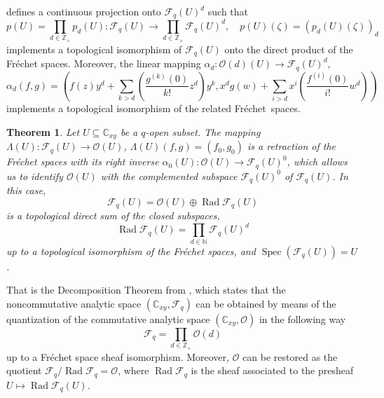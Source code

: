 \documentclass[12pt,reqno]{amsart}%
\newtheorem{theorem}{Theorem}
\theoremstyle{plain}
\numberwithin{theorem}{section} \numberwithin{equation}{section}
\numberwithin{lemma}{section}
\numberwithin{remark}{section}
\numberwithin{example}{section}
\numberwithin{proposition}{section}
\numberwithin{definition}{section}
\numberwithin{corollary}{section}
\begin{document}
defines a continuous projection onto $\mathcal{F}_{q}\left(  U\right)  ^{d}$
such that
\[
p\left(  U\right)  =\prod_{d\in\mathbb{Z}_{+}}p_{d}\left(  U\right)
:\mathcal{F}_{q}\left(  U\right)  \rightarrow\prod_{d\in\mathbb{Z}_{+}%
}\mathcal{F}_{q}\left(  U\right)  ^{d},\quad p\left(  U\right)  \left(
\zeta\right)  =\left(  p_{d}\left(  U\right)  \left(  \zeta\right)  \right)
_{d}%
\]
implements a topological isomorphism of $\mathcal{F}_{q}\left(  U\right)  $
onto the direct product of the Fr\'{e}chet spaces. Moreover, the linear
mapping $\alpha_{d}:\mathcal{O}\left(  d\right)  \left(  U\right)
\rightarrow\mathcal{F}_{q}\left(  U\right)  ^{d},$
\[
\alpha_{d}\left(  f,g\right)  =\left(  f\left(  z\right)  y^{d}+\sum
_{k>d}\left(  \dfrac{g^{\left(  k\right)  }\left(  0\right)  }{k!}%
z^{d}\right)  y^{k},x^{d}g\left(  w\right)  +\sum_{i>d}x^{i}\left(
\dfrac{f^{\left(  i\right)  }\left(  0\right)  }{i!}w^{d}\right)  \right)
\]
implements a topological isomorphism of the related Fr\'{e}chet\ spaces.

\begin{theorem}
\label{thmainDecom}Let $U\subseteq\mathbb{C}_{xy}$ be a $q$-open subset. The
mapping $\Lambda\left(  U\right)  :\mathcal{F}_{q}\left(  U\right)
\rightarrow\mathcal{O}\left(  U\right)  $, $\Lambda\left(  U\right)  \left(
f,g\right)  =\left(  f_{0},g_{0}\right)  $ is a retraction of the Fr\'{e}chet
spaces with its right inverse $\alpha_{0}\left(  U\right)  :\mathcal{O}\left(
U\right)  \rightarrow\mathcal{F}_{q}\left(  U\right)  ^{0}$, which allows us
to identify $\mathcal{O}\left(  U\right)  $ with the complemented subspace
$\mathcal{F}_{q}\left(  U\right)  ^{0}$ of $\mathcal{F}_{q}\left(  U\right)
$. In this case,
\[
\mathcal{F}_{q}\left(  U\right)  =\mathcal{O}\left(  U\right)  \oplus
\operatorname{Rad}\mathcal{F}_{q}\left(  U\right)
\]
is a topological direct sum of the closed subspaces,
\[
\operatorname{Rad}\mathcal{F}_{q}\left(  U\right)  =\prod\limits_{d\in
\mathbb{N}}\mathcal{F}_{q}\left(  U\right)  ^{d}%
\]
up to a topological isomorphism of the Fr\'{e}chet spaces, and
$\operatorname{Spec}\left(  \mathcal{F}_{q}\left(  U\right)  \right)  =U$.
\end{theorem}

That is the Decomposition Theorem from \cite{Dosi25}, which states that the
noncommutative analytic space $\left(  \mathbb{C}_{xy},\mathcal{F}_{q}\right)
$ can be obtained by means of the quantization of the commutative analytic
space $\left(  \mathbb{C}_{xy},\mathcal{O}\right)  $ in the following way
\[
\mathcal{F}_{q}=\prod\limits_{d\in\mathbb{Z}_{+}}\mathcal{O}\left(  d\right)
\]
up to a Fr\'{e}chet space sheaf isomorphism. Moreover, $\mathcal{O}$ can be
restored as the quotient $\mathcal{F}_{q}/\operatorname{Rad}\mathcal{F}%
_{q}=\mathcal{O}$, where $\operatorname{Rad}\mathcal{F}_{q}$ is the sheaf
associated to the presheaf $U\mapsto\operatorname{Rad}\mathcal{F}_{q}\left(
U\right)  $.
\end{document}
